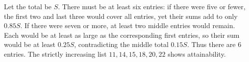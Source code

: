 Let the total be $S$. There must be at least six entries: if there were five or fewer, the first two and last three would cover all entries, yet their sums add to only $0.85S$. If there were seven or more, at least two middle entries would remain. Each would be at least as large as the corresponding first entries, so their sum would be at least $0.25S$, contradicting the middle total $0.15S$. Thus there are $\boxed6$ entries. The strictly increasing list $11,14,15,18,20,22$ shows attainability.
